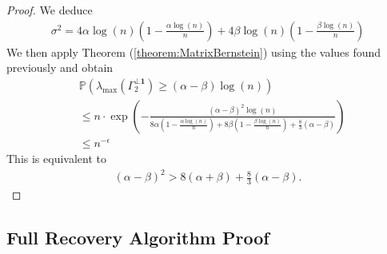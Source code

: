 \documentclass[english]{article}
\newcommand{\1}{\textbf{1}}
\newcommand{\B}{\frac{\beta \log(n)}{n}}
\newcommand{\p}{\mathbb{P}}
\begin{document}
\begin{proof}
We deduce
\begin{align}
\sigma^2= 4\alpha\log(n)\left(1-\frac{\alpha \log(n)}{n} \right) + 4\beta \log(n) \left(1-\B \right)
\end{align}
We then apply Theorem (\ref{theorem:MatrixBernstein}) using the values found previously and obtain
\begin{align}
&\p\left(\lambda_{\max}(\Gamma^{\perp \1}_2) \geq (\alpha-\beta)\log(n)\right)\\
& \leq n \cdot \exp \left(-\frac{(\alpha-\beta)^2\log(n)}{8\alpha\left(1-\frac{\alpha \log(n)}{n} \right) + 8\beta\left(1-\B \right) +\frac83(\alpha-\beta)} \right)\\
& \leq n^{-\epsilon}
\end{align}
This is equivalent to
\begin{align}
(\alpha-\beta)^2 > 8(\alpha+\beta) + \frac83(\alpha-\beta).
\end{align} 
\end{proof}



\subsection{Full Recovery Algorithm Proof}
\end{document}
